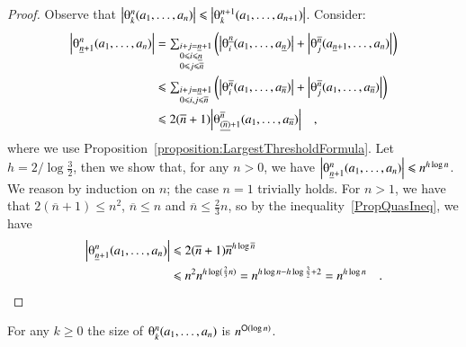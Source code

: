 \begin{proof}
Observe that $\size{\th kn\avec1n}\le\size{\th k{n+1}\avec1{n+1}}$. Consider:
\begin{equation}\label{PropQuasIneq}
\begin{split}
\size{\th{\underline  n+1}n\avec1n}
&=\textstyle\sum_{\begin{subarray}{l}i+j=\underline  n+1    \\
                                     0\le i\le \underline  n\\
                                     0\le j\le {\overline  n}
                  \end{subarray}}
  \left(\size{\th i{\underline  n}\avec1{\underline  n}}+
        \size{\th j{\overline  n}\avec{\underline  n+1}n}\right)             \\
&\le\textstyle\sum_{\begin{subarray}{l}i+j=\underline  n+1\\
                                       0\le i,j\le {\overline  n}
                    \end{subarray}}
  \left(\size{\th i{\overline  n}\avec1{\overline  n}}+
        \size{\th j{\overline  n}\avec1{\overline  n}}\right)                 \\
&\le2({\overline  n}+1)
  \size{\th{\underline {(\overline  n)}+1}{\overline  n}\avec1{\overline  n}}\quad,
\end{split}
\end{equation}
where we use Proposition~\vref{proposition:LargestThresholdFormula}. Let $h=2/\log\frac{3}{2}$, then we show that, for any $n>0$, we have $\size{\th{\underline  n+1}n\avec1n}\le n^{h\log n}$. We reason by induction on $n$; the case $n=1$ trivially holds. For $n>1$, we have that $2(\overline  n+1)\le n^2$, $\overline  n\le n$ and $\overline  n\le\frac{2}{3}n$, so by the inequality~\eqref{PropQuasIneq}, we have
\begin{equation*}
\begin{split}
\size{\th{\underline  n+1}n\avec1n}
&\le2(\overline  n+1)
     {\overline  n}^{h\log\overline  n}
       \\
&\le n^2n^{h\log(\frac{2}{3}n)}=n^{h\log n-h\log\frac{3}{2}+2}=n^{h\log n}
\quad.
\end{split}
\end{equation*}
\end{proof}

\begin{theorem}\label{theorem:SizeThreshold}
For any $k\ge0$ the size of\/ $\th kn\avec1n$ is $n^{{\mathsf O}(\log n)}$.
\end{theorem}


